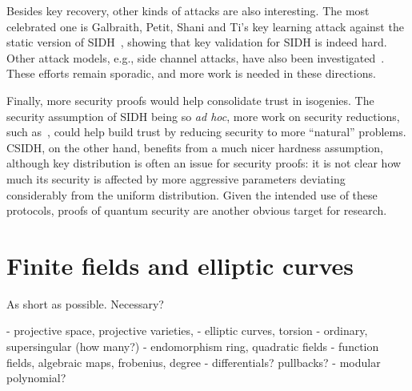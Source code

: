 \documentclass{report}
\theoremstyle{plain}
\theoremstyle{definition}
\begin{document}
Besides key recovery, other kinds of attacks are also interesting. %
The most celebrated one is Galbraith, Petit, Shani and Ti's key
learning attack against the static version of
SIDH~\cite{galbraithsecurity}, showing that key validation for SIDH is
indeed hard. %
Other attack models, e.g., side channel attacks, have also been
investigated~\cite{gelin2017loop,ti2017fault}. %
These efforts remain sporadic, and more work is needed in these
directions. %

Finally, more security proofs would help consolidate trust in
isogenies. %
The security assumption of SIDH being so \emph{ad hoc}, more work on
security reductions, such
as~\cite{galbraithsecurity,cryptoeprint:2017:962}, could help build
trust by reducing security to more ``natural'' problems. %
CSIDH, on the other hand, benefits from a much nicer hardness
assumption, although key distribution is often an issue for security
proofs: it is not clear how much its security is affected by more
aggressive parameters deviating considerably from the uniform
distribution. %
Given the intended use of these protocols, proofs of quantum security
are another obvious target for research.




\appendix

\chapter{Finite fields and elliptic curves}

As short as possible. Necessary?

- projective space, projective varieties,
- elliptic curves, torsion
- ordinary, supersingular (how many?)
- endomorphism ring, quadratic fields
- function fields, algebraic maps, frobenius, degree
- differentials? pullbacks?
- modular polynomial?



\clearpage


\end{document}
